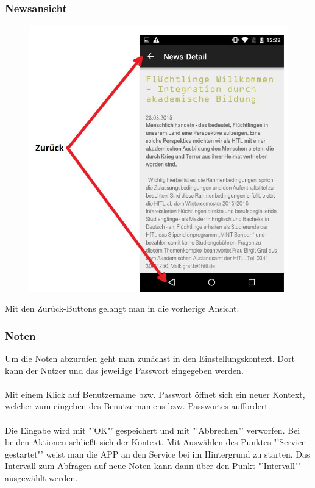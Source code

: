 \newpage
\subsubsection{Newsansicht}
\begin{figure}[H]
	\centering
	\includegraphics[scale=0.6]{03_Bedienungsanleitung/img/news.jpg}
\end{figure}

Mit den Zurück-Buttons gelangt man in die vorherige Ansicht.



\subsubsection{Noten}

Um die Noten abzurufen geht man zunächst in den Einstellungskontext. Dort kann der Nutzer und das jeweilige Passwort eingegeben werden.
\\
\\
Mit einem Klick auf Benutzername bzw. Passwort öffnet sich ein neuer Kontext, welcher zum eingeben des Benutzernamens bzw. Passwortes auffordert.
\\
\\
Die Eingabe wird mit "'OK"' gespeichert und mit "'Abbrechen"' verworfen. Bei beiden Aktionen schließt sich der Kontext.
Mit Auswählen des Punktes "'Service gestartet"' weist man die APP an den Service bei im Hintergrund zu starten. Das Intervall zum Abfragen auf neue Noten kann dann über den Punkt "'Intervall"' ausgewählt werden.

